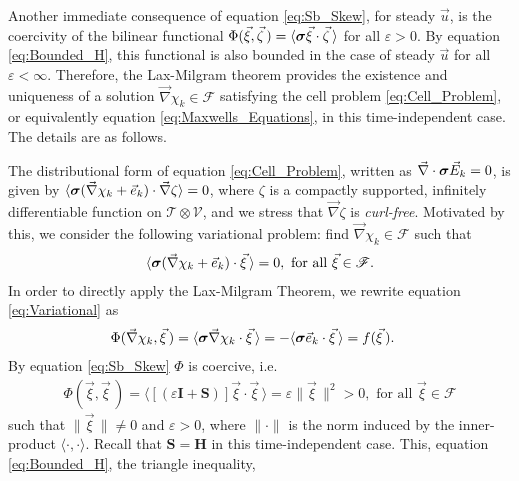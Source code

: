 \documentclass[11pt]{amsart}
\newcommand{\Hb}{\mathbf{H}}
\newcommand{\Ib}{\mathbf{I}}
\newcommand{\Sb}{\mathbf{S}}
\newcommand{\Tc}{\mathcal{T}}
\newcommand{\Vc}{\mathcal{V}}
\newcommand{\Fs}{\mathscr{F}}
\newcommand\bsig{\mbox{\boldmath${\sigma}$}}
\begin{document}
Another immediate consequence of equation \eqref{eq:Sb_Skew}, for
steady $\vec{u}$, is the coercivity of the bilinear functional
$\Phi(\vec{\xi},\vec{\zeta}\,)=\langle\bsig\vec{\xi}\cdot\vec{\zeta}\,\rangle$ for all $\varepsilon>0$. By equation
\eqref{eq:Bounded_H}, this functional is also bounded in the case of
steady $\vec{u}$ for all $\varepsilon<\infty$. Therefore, the Lax-Milgram theorem
\cite{McOwen:2003:PDE} provides the existence and uniqueness of a
solution $\vec{\nabla}\chi_k\in\Fs$ satisfying the cell problem
\eqref{eq:Cell_Problem}, or equivalently equation
\eqref{eq:Maxwells_Equations}, in this time-independent case. The
details are as follows. 




The distributional form of equation \eqref{eq:Cell_Problem}, written
as $\vec{\nabla}\cdot\bsig\vec{E}_k=0$, is given by
$\langle\bsig(\vec{\nabla}\chi_k+\vec{e}_k)\cdot\vec{\nabla}\zeta\rangle=0$, where $\zeta$ is a compactly
supported, infinitely differentiable function on $\Tc\otimes\Vc$, and we
stress that $\vec{\nabla}\zeta$ is \emph{curl-free}. Motivated by this, we
consider the following variational problem: find $\vec{\nabla}\chi_k\in\Fs$ such
that   
%
\begin{align}\label{eq:Variational}
  \langle\bsig(\vec{\nabla}\chi_k+\vec{e}_k)\cdot\vec{\xi}\,\rangle=0, \text{ for all }
  \vec{\xi}\in\Fs.
\end{align}
%
In order to directly apply the Lax-Milgram Theorem, we rewrite
equation \eqref{eq:Variational} as 
%
\begin{align}  \label{eq:Bilinear_functional_E} 
   &\Phi(\vec{\nabla}\chi_k,\vec{\xi}\,)
     =\langle\bsig\vec{\nabla}\chi_k\cdot\vec{\xi}\,\rangle
     =-\langle\bsig\vec{e}_k\cdot\vec{\xi}\,\rangle
     =f(\vec{\xi}\,). 
\end{align}
%
By equation \eqref{eq:Sb_Skew} $\Phi$ is coercive, i.e.
%
\begin{align}\label{eq:Phi_Coercive}
  \Phi(\vec{\xi},\vec{\xi}\,)=\langle[(\varepsilon\Ib+\Sb)]\vec{\xi}\cdot\vec{\xi}\,\rangle=\varepsilon\|\vec{\xi}\,\|^2>0,
   \text{ for all } \vec{\xi}\in\Fs
\end{align}
%
such that $\|\vec{\xi}\,\|\neq0$ and $\varepsilon>0$, where $\|\cdot\|$
is the norm induced by the inner-product $\langle\cdot,\cdot\rangle$. Recall that
$\Sb=\Hb$ in this time-independent case. This, equation 
\eqref{eq:Bounded_H}, the triangle inequality,
\end{document}
